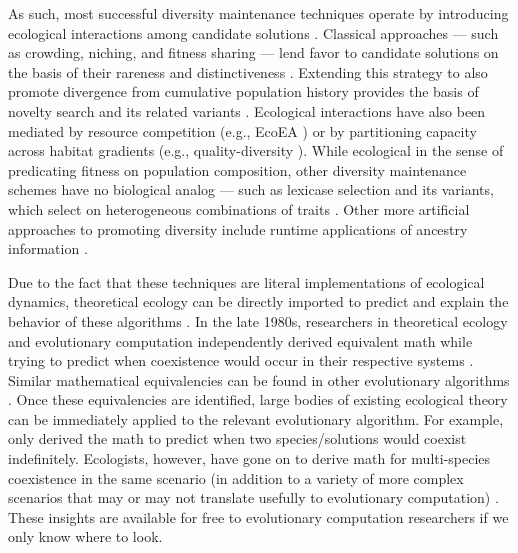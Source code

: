 As such, most successful diversity maintenance techniques operate by introducing ecological interactions among candidate solutions \citep{dolson2018applying, dolson2018ecological}.
Classical approaches --- such as crowding, niching, and fitness sharing --- lend favor to candidate solutions on the basis of their rareness and distinctiveness \citep{mahfoud1996niching,petrowski1996clearing,dejong1975analysis,friedrich2009analysis}.
Extending this strategy to also promote divergence from cumulative population history provides the basis of novelty search and its related variants \citep{lehman2011abandoning,pugh2016quality,lehman2011evolving}.
Ecological interactions have also been mediated by resource competition (e.g., EcoEA \citep{goings2009ecological,goings2012ecologybased}) or by partitioning capacity across habitat gradients (e.g., quality-diversity \citep{mouret2015illuminating,cully2018quality}).
While ecological in the sense of predicating fitness on population composition, other diversity maintenance schemes have no biological analog --- such as lexicase selection and its variants, which select on heterogeneous combinations of traits \citep{spector2012assessment,ferguson2020characterizing,boldi2024informed,lacava2016epsilonlexicase}.
Other more artificial approaches to promoting diversity include runtime applications of ancestry information \citep{burlacu2019online,gabor2018inheritancebased,gabor2018preparing,burke2003increased,lalejini2024phylogenyinformed,lalejini2024runtime,murphy2008simple,burlacu2023population}.

Due to the fact that these techniques are literal implementations of ecological dynamics, theoretical ecology can be directly imported to predict and explain the behavior of these algorithms \citep{dolson2018ecological}.
In the late 1980s, researchers in theoretical ecology \citep{chesson1990macarthur} and evolutionary computation \citep{deb1989investigation} independently derived equivalent math while trying to predict when coexistence would occur in their respective systems \citep{dolson2018ecological}.
Similar mathematical equivalencies can be found in other evolutionary algorithms \citep{dolson2018ecological}.
Once these equivalencies are identified, large bodies of existing ecological theory can be immediately applied to the relevant evolutionary algorithm.
For example, \citet{deb1989investigation} only derived the math to predict when two species/solutions would coexist indefinitely.
Ecologists, however, have gone on to derive math for multi-species coexistence in the same scenario (in addition to a variety of more complex scenarios that may or may not translate usefully to evolutionary computation) \citep{barabas2016multispecies,saavedra2017structural,chesson2000mechanisms}.
These insights are available for free to evolutionary computation researchers if we only know where to look.

